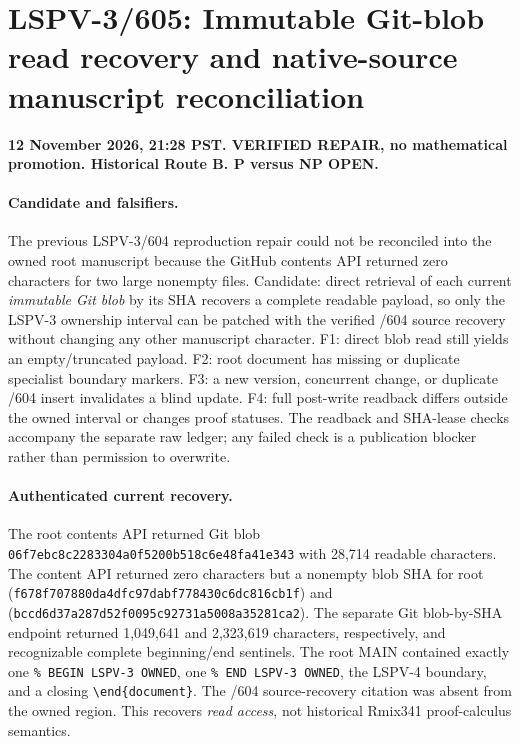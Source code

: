 \documentclass[11pt]{article}
\begin{document}
\section*{LSPV-3/605: Immutable Git-blob read recovery and native-source manuscript reconciliation}
\noindent\textbf{12 November 2026, 21:28 PST. VERIFIED REPAIR, no mathematical promotion. Historical Route B. P versus NP OPEN.}

\paragraph{Candidate and falsifiers.}
The previous LSPV-3/604 reproduction repair could not be reconciled into the owned root manuscript because the GitHub contents API returned zero characters for two large nonempty files. Candidate: direct retrieval of each current \emph{immutable Git blob} by its SHA recovers a complete readable payload, so only the LSPV-3 ownership interval can be patched with the verified /604 source recovery without changing any other manuscript character. F1: direct blob read still yields an empty/truncated payload. F2: root document has missing or duplicate specialist boundary markers. F3: a new version, concurrent change, or duplicate /604 insert invalidates a blind update. F4: full post-write readback differs outside the owned interval or changes proof statuses. The readback and SHA-lease checks accompany the separate raw ledger; any failed check is a publication blocker rather than permission to overwrite.

\paragraph{Authenticated current recovery.}
The root  contents API returned Git blob \texttt{06f7ebc8c2283304a0f5200b518c6e48fa41e343} with 28,714 readable characters. The content API returned zero characters but a nonempty blob SHA for root  (\texttt{f678f707880da4dfc97dabf778430c6dc816cb1f}) and  (\texttt{bccd6d37a287d52f0095c92731a5008a35281ca2}). The separate Git blob-by-SHA endpoint returned 1,049,641 and 2,323,619 characters, respectively, and recognizable complete beginning/end sentinels. The root MAIN contained exactly one \texttt{\% BEGIN LSPV-3 OWNED}, one \texttt{\% END LSPV-3 OWNED}, the LSPV-4 boundary, and a closing \verb|\end{document}|. The /604 source-recovery citation was absent from the owned region. This recovers \emph{read access}, not historical Rmix341 proof-calculus semantics.
\end{document}
